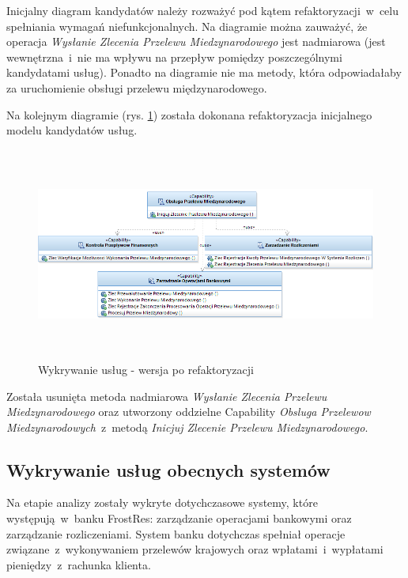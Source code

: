 Inicjalny diagram kandydatów należy rozważyć pod kątem refaktoryzacji~w~celu spełniania wymagań niefunkcjonalnych. Na diagramie można zauważyć, że operacja \emph{Wysłanie Zlecenia Przelewu Miedzynarodowego} jest nadmiarowa (jest wewnętrzna~i~nie ma wpływu na przepływ pomiędzy poszczególnymi kandydatami usług). Ponadto na diagramie nie ma metody, która odpowiadałaby za uruchomienie obsługi przelewu międzynarodowego. 

Na kolejnym diagramie (rys. \ref{service_candidates_refactored}) została dokonana refaktoryzacja inicjalnego modelu kandydatów usług. 

\begin{figure}[h!tbp]
\begin{centering}
\includegraphics[width=16cm, height=7cm]{img/service_candidates_refactored.png}
\caption[Wykrywanie usług - wersja po refaktoryzacji]{Wykrywanie usług - wersja po refaktoryzacji}\label{service_candidates_refactored}
\end{centering}
\end{figure}

Została usunięta metoda nadmiarowa \emph{Wysłanie Zlecenia Przelewu Miedzynarodowego} oraz utworzony oddzielne Capability \emph{Obsluga Przelewow Miedzynarodowych}~z~metodą \emph{Inicjuj Zlecenie Przelewu Miedzynarodowego}.

\subsection{Wykrywanie usług obecnych systemów}
Na etapie analizy zostały wykryte dotychczasowe systemy, które występują~w~banku FrostRes: zarządzanie operacjami bankowymi oraz zarządzanie rozliczeniami. System banku dotychczas spełniał operacje związane~z~wykonywaniem przelewów krajowych oraz wpłatami~i~wypłatami pieniędzy~z~rachunka klienta. 

